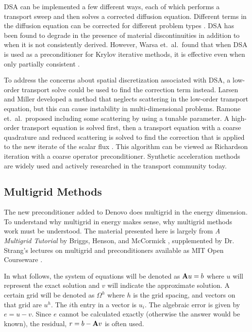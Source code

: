 DSA can be implemented a few different ways, each of which performs a transport sweep and then solves a corrected diffusion equation. Different terms in the diffusion equation can be corrected for different problem types \cite{Alcouffe1977}. DSA has been found to degrade in the presence of material discontinuities in addition to when it is not consistently derived. However, Warsa et.\ al.\ found that when DSA is used as a preconditioner for Krylov iterative methods, it is effective even when only partially consistent \cite{Warsa2004}.

To address the concerns about spatial discretization associated with DSA, a low-order transport solve could be used to find the correction term instead. Larsen and Miller developed a method that neglects scattering in the low-order transport equation, but this can cause instability in multi-dimensional problems. Ramone et.\ al.\ proposed including some scattering by using a tunable parameter. A high-order transport equation is solved first, then a transport equation with a coarse quadrature and reduced scattering is solved to find the correction that is applied to the new iterate of the scalar flux \cite{Ramone1997}. This algorithm can be viewed as Richardson iteration with a coarse operator preconditioner. Synthetic acceleration methods are widely used and actively researched in the transport community today.

\subsection{Multigrid Methods}
The new preconditioner added to Denovo does multigrid in the energy dimension. To understand why multigrid in energy makes sense, why multigrid methods work must be understood. The material presented here is largely from \emph{A Multigrid Tutorial} by Briggs, Henson, and McCormick \cite{Briggs2000}, supplemented by Dr. Strang's lectures on multigrid and preconditioners available as MIT Open Courseware \cite{Strang}.

In what follows, the system of equations will be denoted as $\mathbf{A}u=b$ where $u$ will represent the exact solution and $v$ will indicate the approximate solution.  A certain grid will be denoted as $\Omega^{h}$ where $h$ is the grid spacing, and vectors on that grid are $u^{h}$. The $i$th entry in a vector is $u_{i}$. The algebraic error is given by $e = u - v$. Since $e$ cannot be calculated exactly (otherwise the answer would be known), the residual, $r = b - \mathbf{A}v$ is often used. 

